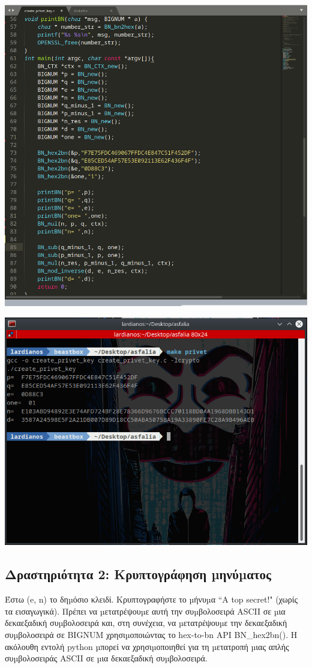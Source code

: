 \begin{center}
			\includegraphics[width=1\textwidth]{image/image31code.PNG}		
\end{center}
\begin{center}
			\includegraphics[width=1\textwidth]{image/image31term.PNG}		
\end{center}


\subsection{Δραστηριότητα 2: Κρυπτογράφηση µηνύµατος}
\noindent
Έστω (e, n) το δηµόσιο κλειδί. Κρυπτογραφήστε το µήνυµα “A top secret!" (χωρίς τα
εισαγωγικά). Πρέπει να µετατρέψουµε αυτή την συµβολοσειρά ASCII σε µια δεκαεξαδική
συµβολοσειρά και, στη συνέχεια, να µετατρέψουµε την δεκαεξαδική συµβολοσειρά σε BIGNUM
χρησιµοποιώντας το hex-to-bn API BN\_hex2bn(). Η ακόλουθη εντολή python µπορεί να
χρησιµοποιηθεί για τη µετατροπή µιας απλής συµβολοσειράς ASCII σε µια δεκαεξαδική
συµβολοσειρά.

